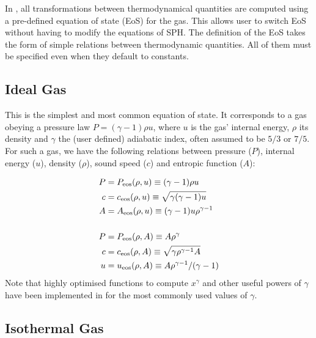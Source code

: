 
In \swift, all transformations between thermodynamical quantities are
computed using a pre-defined equation of state (EoS) for the gas. This
allows user to switch EoS without having to modify the equations of
SPH. The definition of the EoS takes the form of simple relations
between thermodynamic quantities. All of them must be specified even
when they default to constants.

\subsection{Ideal Gas}
\label{sec:eos:ideal}

This is the simplest and most common equation of state. It corresponds
to a gas obeying a pressure law $P = (\gamma-1) \rho u$, where $u$ is
the gas' internal energy, $\rho$ its density and $\gamma$ the
(user defined) adiabatic index, often assumed to be $5/3$ or $7/5$. For such a gas,
we have the following relations between pressure ($P$), internal energy
($u$), density ($\rho$), sound speed ($c$) and entropic function ($A$):

\begin{align}
  P &= P_{\rm eos}(\rho, u) \equiv  (\gamma-1) \rho
  u \label{eq:eos:ideal:P_from_u} \\
  c &= c_{\rm eos}(\rho, u) \equiv \sqrt{\gamma (\gamma-1)
    u} \label{eq:eos:ideal:c_from_u} \\
  A &= A_{\rm eos}(\rho, u) \equiv(\gamma-1) u
  \rho^{\gamma-1} \label{eq:eos:ideal:A_from_u} \\
  ~ \nonumber\\
  P &= P_{\rm eos}(\rho, A) \equiv A
  \rho^{\gamma} \label{eq:eos:ideal:P_from_A} \\
  c &= c_{\rm eos}(\rho, A) \equiv \sqrt{\gamma \rho^{\gamma-1}
    A} \label{eq:eos:ideal:c_from_A} \\
  u &= u_{\rm eos}(\rho, A) \equiv A \rho^{\gamma-1} /
  (\gamma-1) \label{eq:eos:ideal:u_from_A}
\end{align}
Note that highly optimised functions to compute $x^\gamma$ and other
useful powers of $\gamma$ have been implemented in \swift for the most
commonly used values of $\gamma$.


\subsection{Isothermal Gas}
\label{sec:eos:isothermal}

